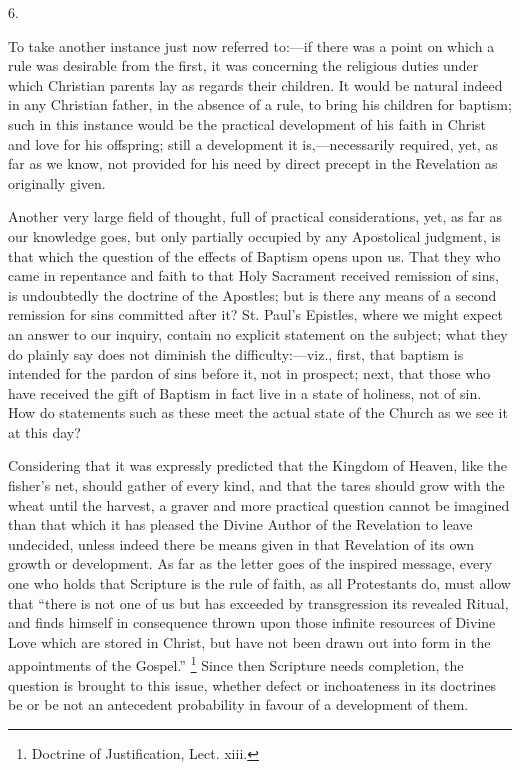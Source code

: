 6.

To take another instance just now referred to:—if
there was a point on which a rule was desirable from the
first, it was concerning the religious duties under which
Christian parents lay as regards their children. It would
be natural indeed in any Christian father, in the absence
of a rule, to bring his children for baptism; such in
this instance would be the practical development of his
faith in Christ and love for his offspring; still a
development it is,—necessarily required, yet, as far
as we know, not provided for his need by direct precept
in the Revelation as originally given.

Another very large field of thought, full of practical
considerations, yet, as far as our knowledge goes, but
only partially occupied by any Apostolical judgment, is
that which the question of the effects of Baptism opens
upon us. That they who came in repentance and faith to
that Holy Sacrament received remission of sins, is
undoubtedly the doctrine of the Apostles; but is there
any means of a second remission for sins committed after
it? St. Paul's Epistles, where we might expect an answer
to our inquiry, contain no explicit statement on the
subject; what they do plainly say does not diminish the
difficulty:—viz., first, that baptism is intended
for the pardon of sins before it, not in prospect; next,
that those who have received the gift of Baptism in fact
live in a state of holiness, not of sin. How do
statements such as these meet the actual state of the
Church as we see it at this day?

Considering that it was expressly predicted that the Kingdom of Heaven, like the fisher's net, should
gather of every kind, and that the tares should grow with
the wheat until the harvest, a graver and more practical
question cannot be imagined than that which it has
pleased the Divine Author of the Revelation to leave
undecided, unless indeed there be means given in that
Revelation of its own growth or development. As far as
the letter goes of the inspired message, every one who
holds that Scripture is the rule of faith, as all
Protestants do, must allow that ``there is not one of
us but has exceeded by transgression its revealed Ritual,
and finds himself in consequence thrown upon those
infinite resources of Divine Love which are stored in
Christ, but have not been drawn out into form in the
appointments of the Gospel.'' \footnote{Doctrine of Justification, Lect. xiii.} Since then Scripture needs
completion, the question is brought to this issue,
whether defect or inchoateness in its doctrines be or be
not an antecedent probability in favour of a development
of them.


